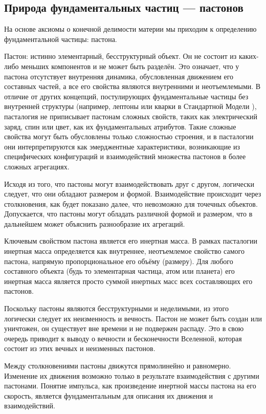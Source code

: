 \documentclass[pdflatex,sn-mathphys-num]{sn-jnl}
\begin{document}
\subsection{Природа фундаментальных частиц --- пастонов}\label{subsec:pastons}

На основе аксиомы о конечной делимости материи мы приходим к определению фундаментальной частицы: пастона.

Пастон: истинно элементарный, бесструктурный объект. Он не состоит из каких-либо меньших компонентов и не может быть разделён. Это означает, что у пастона отсутствует внутренняя динамика, обусловленная движением его составных частей, а все его свойства являются внутренними и неотъемлемыми. В отличие от других концепций, постулирующих фундаментальные частицы без внутренней структуры (например, лептоны или кварки в Стандартной Модели \cite{pdg2024}), пасталогия не приписывает пастонам сложных свойств, таких как электрический заряд, спин или цвет, как их фундаментальных атрибутов. Такие сложные свойства могут быть обусловлены только сложностью строения, и в пасталогии они интерпретируются как эмерджентные характеристики, возникающие из специфических конфигураций и взаимодействий множества пастонов в более сложных агрегациях.

Исходя из того, что пастоны могут взаимодействовать друг с другом, логически следует, что они обладают размером и формой. Взаимодействие происходит через столкновения, как будет показано далее, что невозможно для точечных объектов. Допускается, что пастоны могут обладать различной формой и размером, что в дальнейшем может объяснить разнообразие их агрегаций.

Ключевым свойством пастона является его инертная масса. В рамках пасталогии инертная масса определяется как внутреннее, неотъемлемое свойство самого пастона, напрямую пропорциональное его объёму (размеру). Для любого составного объекта (будь то элементарная частица, атом или планета) его инертная масса является просто суммой инертных масс всех составляющих его пастонов.

Поскольку пастоны являются бесструктурными и неделимыми, из этого логически следует их неизменность и вечность. Пастон не может быть создан или уничтожен, он существует вне времени и не подвержен распаду. Это в свою очередь приводит к выводу о вечности и бесконечности Вселенной, которая состоит из этих вечных и неизменных пастонов.

Между столкновениями пастоны движутся прямолинейно и равномерно. Изменение их движения возможно только в результате взаимодействия с другими пастонами. Понятие импульса, как произведение инертной массы пастона на его скорость, является фундаментальным для описания их движения и взаимодействий.
\end{document}
